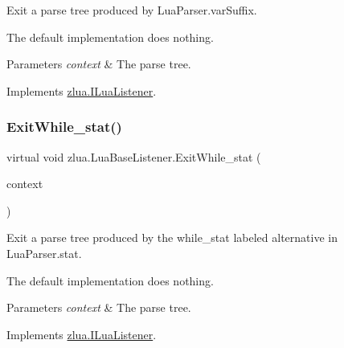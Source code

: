 Exit a parse tree produced by Lua\+Parser.\+var\+Suffix. 

The default implementation does nothing.


\begin{DoxyParams}{Parameters}
{\em context} & The parse tree.\\
\hline
\end{DoxyParams}


Implements \mbox{\hyperlink{interfacezlua_1_1_i_lua_listener_a6445ba070fc2f85e9a4ca3caf3a75d0b}{zlua.\+I\+Lua\+Listener}}.

\mbox{\label{classzlua_1_1_lua_base_listener_a35e673f6a18bfef7e92e04ef244093fc}} 
\subsubsection{\texorpdfstring{Exit\+While\+\_\+stat()}{ExitWhile\_stat()}}
{\footnotesize\ttfamily virtual void zlua.\+Lua\+Base\+Listener.\+Exit\+While\+\_\+stat (\begin{DoxyParamCaption}\item[{\mbox{[}\+Not\+Null\mbox{]} \mbox{\hyperlink{classzlua_1_1_lua_parser_1_1_while__stat_context}{Lua\+Parser.\+While\+\_\+stat\+Context}}}]{context }\end{DoxyParamCaption})\hspace{0.3cm}{\ttfamily [virtual]}}



Exit a parse tree produced by the {\ttfamily while\+\_\+stat} labeled alternative in Lua\+Parser.\+stat. 

The default implementation does nothing.


\begin{DoxyParams}{Parameters}
{\em context} & The parse tree.\\
\hline
\end{DoxyParams}


Implements \mbox{\hyperlink{interfacezlua_1_1_i_lua_listener_ab7cdf0dd588b664e1f8efbca0a03884e}{zlua.\+I\+Lua\+Listener}}.

\mbox{\label{classzlua_1_1_lua_base_listener_abd2e864ac32107d653a410868637a8f7}} 
